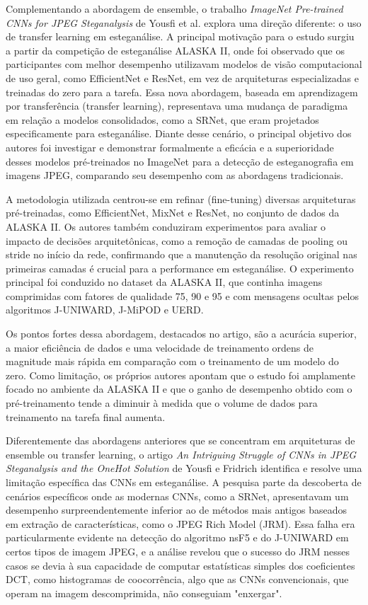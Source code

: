 \documentclass[12pt]{article}
\begin{document}

Complementando a abordagem de ensemble, o trabalho \textit{ImageNet Pre-trained
  CNNs for JPEG Steganalysis} de Yousfi et al. \cite{fridrich2020imagenet}
explora uma direção diferente: o uso de transfer learning em esteganálise. A
principal motivação para o estudo surgiu a partir da competição de esteganálise
ALASKA II, onde foi observado que os participantes com melhor desempenho
utilizavam modelos de visão computacional de uso geral, como EfficientNet e
ResNet, em vez de arquiteturas especializadas e treinadas do zero para a
tarefa. Essa nova abordagem, baseada em aprendizagem por transferência
(transfer learning), representava uma mudança de paradigma em relação a modelos
consolidados, como a SRNet, que eram projetados especificamente para
esteganálise. Diante desse cenário, o principal objetivo dos autores foi
investigar e demonstrar formalmente a eficácia e a superioridade desses modelos
pré-treinados no ImageNet para a detecção de esteganografia em imagens JPEG,
comparando seu desempenho com as abordagens tradicionais.

A metodologia utilizada centrou-se em refinar (fine-tuning) diversas
arquiteturas pré-treinadas, como EfficientNet, MixNet e ResNet, no conjunto de
dados da ALASKA II. Os autores também conduziram experimentos para avaliar o
impacto de decisões arquitetônicas, como a remoção de camadas de pooling ou
stride no início da rede, confirmando que a manutenção da resolução original
nas primeiras camadas é crucial para a performance em esteganálise. O
experimento principal foi conduzido no dataset da ALASKA II, que continha
imagens comprimidas com fatores de qualidade 75, 90 e 95 e com mensagens
ocultas pelos algoritmos J-UNIWARD, J-MiPOD e UERD.

Os pontos fortes dessa abordagem, destacados no artigo, são a acurácia
superior, a maior eficiência de dados e uma velocidade de treinamento ordens de
magnitude mais rápida em comparação com o treinamento de um modelo do zero.
Como limitação, os próprios autores apontam que o estudo foi amplamente focado
no ambiente da ALASKA II e que o ganho de desempenho obtido com o
pré-treinamento tende a diminuir à medida que o volume de dados para
treinamento na tarefa final aumenta.

Diferentemente das abordagens anteriores que se concentram em arquiteturas de
ensemble ou transfer learning, o artigo \textit{An Intriguing Struggle of CNNs
  in JPEG Steganalysis and the OneHot Solution} de Yousfi e Fridrich
\cite{fridrichOnehot} identifica e resolve uma limitação específica das CNNs em
esteganálise. A pesquisa parte da descoberta de cenários específicos onde as
modernas CNNs, como a SRNet, apresentavam um desempenho surpreendentemente
inferior ao de métodos mais antigos baseados em extração de características,
como o JPEG Rich Model (JRM). Essa falha era particularmente evidente na
detecção do algoritmo nsF5 e do J-UNIWARD em certos tipos de imagem JPEG, e a
análise revelou que o sucesso do JRM nesses casos se devia à sua capacidade de
computar estatísticas simples dos coeficientes DCT, como histogramas de
coocorrência, algo que as CNNs convencionais, que operam na imagem
descomprimida, não conseguiam "enxergar".
\end{document}
